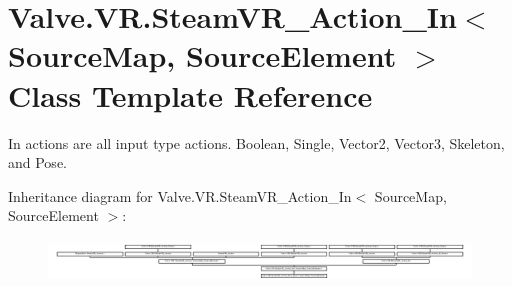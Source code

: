 \hypertarget{class_valve_1_1_v_r_1_1_steam_v_r___action___in}{}\section{Valve.\+V\+R.\+Steam\+V\+R\+\_\+\+Action\+\_\+\+In$<$ Source\+Map, Source\+Element $>$ Class Template Reference}
\label{class_valve_1_1_v_r_1_1_steam_v_r___action___in}


In actions are all input type actions. Boolean, Single, Vector2, Vector3, Skeleton, and Pose.  


Inheritance diagram for Valve.\+V\+R.\+Steam\+V\+R\+\_\+\+Action\+\_\+\+In$<$ Source\+Map, Source\+Element $>$\+:\begin{figure}[H]
\begin{center}
\leavevmode
\includegraphics[height=1.095462cm]{class_valve_1_1_v_r_1_1_steam_v_r___action___in}
\end{center}
\end{figure}
